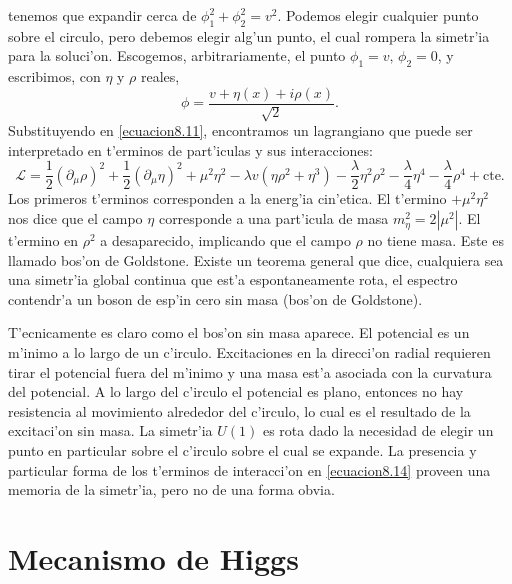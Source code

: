   tenemos que expandir cerca de $\phi_{1}^{2}+\phi_{2}^{2}=v^{2}$.
  Podemos elegir cualquier punto sobre el circulo, pero debemos elegir alg'un punto, el cual rompera la simetr'ia para la soluci'on. Escogemos, arbitrariamente, el punto $\phi_{1}=v,\,\phi_{2}=0$,
  y escribimos, con $\eta$
  y $\rho$
  reales,
  \begin{equation}
  \phi=\frac{v+\eta(x)+i\rho(x)}{\sqrt{2}}.
  \end{equation}
  Substituyendo en \eqref{ecuacion8.11}, encontramos un lagrangiano que puede ser interpretado en t'erminos de part'iculas y sus interacciones:
\begin{equation}\label{ecuacion8.14}
\mathcal{L}=\frac{1}{2}(\partial_{\mu}\rho)^{2}+\frac{1}{2}(\partial_{\mu}\eta)^{2}+\mu^{2}\eta^{2}-\lambda v\left(\eta\rho^{2}+\eta^{3}\right)-\frac{\lambda}{2}\eta^{2}\rho^{2}-\frac{\lambda}{4}\eta^{4}-\frac{\lambda}{4}\rho^{4}+\text{cte}.
\end{equation}
Los primeros t'erminos corresponden a la energ'ia cin'etica. El t'ermino $+\mu^{2}\eta^{2}$
  nos dice que el campo $\eta$
  corresponde a una part'icula de masa $m_{\eta}^{2}=2\left|\mu^{2}\right|$.
  El t'ermino en $\rho^{2}$
  a desaparecido, implicando que el campo $\rho$
  no tiene masa. Este es llamado bos'on de Goldstone. Existe un teorema general que dice, cualquiera sea una simetr'ia global continua que  est'a espontaneamente rota, el espectro contendr'a un boson de esp'in cero sin masa (bos'on de Goldstone).

T'ecnicamente es claro como el bos'on sin masa aparece. El potencial es un m'inimo a lo largo de un c'irculo. Excitaciones en la direcci'on radial requieren  tirar el potencial fuera del m'inimo y una masa est'a asociada con la curvatura del potencial. A lo largo del c'irculo el potencial es plano, entonces no hay resistencia al movimiento alrededor del c'irculo, lo cual es el resultado de la excitaci'on sin masa. La simetr'ia $U(1)$
  es rota dado la necesidad de elegir un punto en particular sobre el c'irculo sobre el cual se expande. La presencia y particular forma de los t'erminos de interacci'on en \eqref{ecuacion8.14} proveen una memoria de la simetr'ia, pero no de una forma obvia.
\section{Mecanismo de Higgs}
